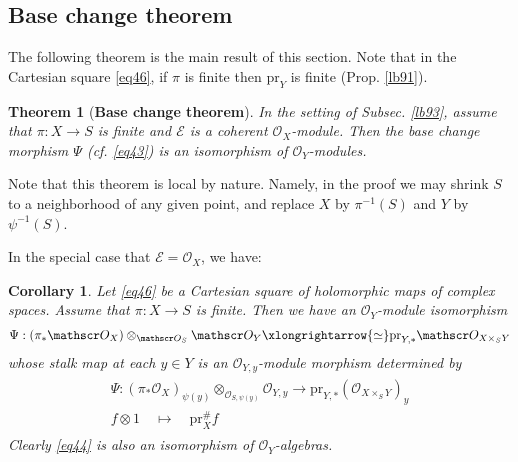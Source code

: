 \documentclass[12pt,b5paper,notitlepage]{report}
\theoremstyle{definition}
\theoremstyle{plain}
\newtheorem{thm}[df]{Theorem}
\newtheorem{co}[df]{Corollary}
\newcommand{\scr}{\mathscr}
\newcommand{\Cbb}{\mathbb C}
\newcommand{\pr}{\mathrm {pr}}
\numberwithin{equation}{section}
\begin{document}
\subsection{Base change theorem}




The following theorem is the main result of this section. Note that in the Cartesian square \eqref{eq46}, if $\pi$ is finite then $\pr_Y$ is finite (Prop. \ref{lb91}).



\begin{thm}[\textbf{Base change theorem}]\label{lb94}
In the setting of Subsec. \ref{lb93}, assume that $\pi:X\rightarrow S$ is finite and $\scr E$ is a coherent $\scr O_X$-module. Then the base change morphism $\Psi$ (cf. \eqref{eq43}) is an isomorphism of $\scr O_Y$-modules.
\end{thm}


Note that this theorem is local by nature. Namely, in the proof we may shrink $S$ to a neighborhood of any given point, and replace $X$ by $\pi^{-1}(S)$ and $Y$ by $\psi^{-1}(S)$. 


In the special case that $\scr E=\scr O_X$, we have:

\begin{co}\label{lb95}
Let \eqref{eq46} be a Cartesian square of holomorphic maps of complex spaces. Assume that $\pi:X\rightarrow S$ is finite. Then we have an $\scr O_Y$-module isomorphism
\begin{align}\label{eq44}
\Psi:(\pi_*\scr O_X)\otimes_{\scr O_S}\scr O_Y\xlongrightarrow{\simeq} \pr_{Y,*}\scr O_{X\times_SY}
\end{align}
whose stalk map at each $y\in Y$ is an $\scr O_{Y,y}$-module morphism determined by
\begin{gather}\label{eq45}
\begin{gathered}
\Psi:(\pi_*\scr O_X)_{\psi(y)}\otimes_{\scr O_{S,\psi(y)}}\scr O_{Y,y}\longrightarrow \pr_{Y,*}(\scr O_{X\times_SY})_y\\[0.8ex]
f\otimes 1\quad\mapsto\quad \pr_X^\#f
\end{gathered}
\end{gather}
Clearly \eqref{eq44} is also an isomorphism of $\scr O_Y$-algebras.
\end{co}
\end{document}
